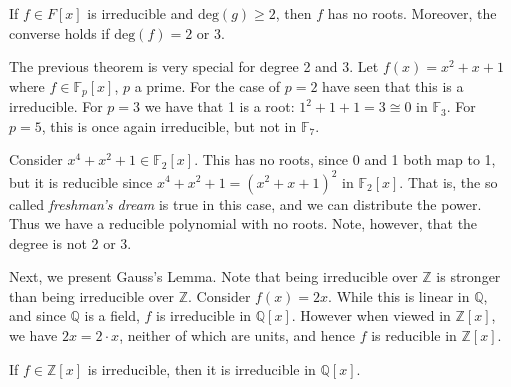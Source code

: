 \documentclass{article}                                                        %
\begin{document}
        \begin{theorem}
            If $f\in{F}[x]$ is irreducible and $\textrm{deg}(g)\geq{2}$, then
            $f$ has no roots. Moreover, the converse holds if
            $\textrm{deg}(f)=2$ or 3.
        \end{theorem}
        \begin{example}
            The previous theorem is very special for degree 2 and 3. Let
            $f(x)=x^{2}+x+1$ where $f\in\mathbb{F}_{p}[x]$, $p$ a prime.
            For the case of $p=2$ have seen that this is a irreducible. For
            $p=3$ we have that 1 is a root: $1^{2}+1+1=3\cong{0}$ in
            $\mathbb{F}_{3}$. For $p=5$, this is once again irreducible,
            but not in $\mathbb{F}_{7}$.
        \end{example}
        \begin{example}
            Consider $x^{4}+x^{2}+1\in\mathbb{F}_{2}[x]$. This has no roots,
            since 0 and 1 both map to 1, but it is reducible since
            $x^{4}+x^{2}+1=(x^{2}+x+1)^{2}$ in $\mathbb{F}_{2}[x]$. That is,
            the so called \textit{freshman's dream} is true in this case, and
            we can distribute the power. Thus we have a reducible polynomial
            with no roots. Note, however, that the degree is not 2 or 3.
        \end{example}
        Next, we present Gauss's Lemma. Note that being irreducible over
        $\mathbb{Z}$ is stronger than being irreducible over $\mathbb{Z}$.
        Consider $f(x)=2x$. While this is linear in $\mathbb{Q}$, and since
        $\mathbb{Q}$ is a field, $f$ is irreducible in $\mathbb{Q}[x]$. However
        when viewed in $\mathbb{Z}[x]$, we have $2x=2\cdot{x}$, neither of
        which are units, and hence $f$ is reducible in $\mathbb{Z}[x]$.
        \begin{theorem}
            If $f\in\mathbb{Z}[x]$ is irreducible, then it is irreducible in
            $\mathbb{Q}[x]$.
        \end{theorem}
\end{document}
